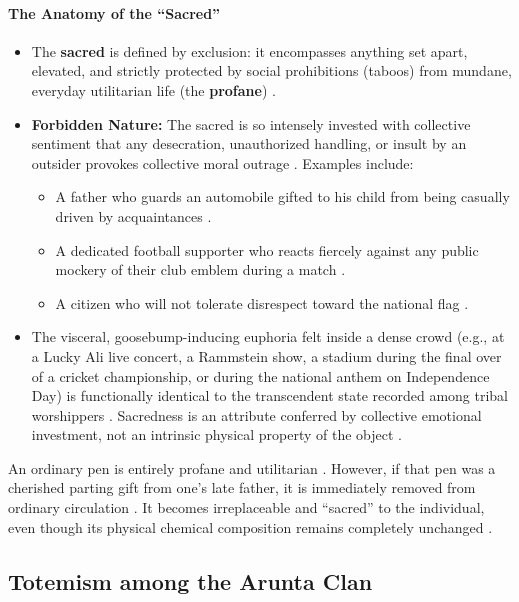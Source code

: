 \paragraph{The Anatomy of the ``Sacred''}
\begin{itemize}
    \item The \textbf{sacred} is defined by exclusion: it encompasses anything set apart, elevated, and strictly protected by social prohibitions (taboos) from mundane, everyday utilitarian life (the \textbf{profane}) .
    \item \textbf{Forbidden Nature:} The sacred is so intensely invested with collective sentiment that any desecration, unauthorized handling, or insult by an outsider provokes collective moral outrage . Examples include:
    \begin{itemize}
        \item A father who guards an automobile gifted to his child from being casually driven by acquaintances .
        \item A dedicated football supporter who reacts fiercely against any public mockery of their club emblem during a match .
        \item A citizen who will not tolerate disrespect toward the national flag .
    \end{itemize}
    \item The visceral, goosebump-inducing euphoria felt inside a dense crowd (e.g., at a Lucky Ali live concert, a Rammstein show, a stadium during the final over of a cricket championship, or during the national anthem on Independence Day) is functionally identical to the transcendent state recorded among tribal worshippers . Sacredness is an attribute conferred by collective emotional investment, not an intrinsic physical property of the object .
\end{itemize}

\begin{ExampleBox}
An ordinary pen is entirely profane and utilitarian . However, if that pen was a cherished parting gift from one's late father, it is immediately removed from ordinary circulation . It becomes irreplaceable and ``sacred'' to the individual, even though its physical chemical composition remains completely unchanged .
\end{ExampleBox}

\subsection{Totemism among the Arunta Clan}

